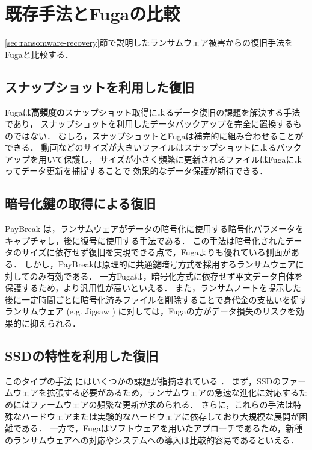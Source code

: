 \section{既存手法とFugaの比較}
\ref{sec:ransomware-recovery}節で説明したランサムウェア被害からの復旧手法をFugaと比較する．
\subsection{スナップショットを利用した復旧}
Fugaは\textbf{高頻度の}スナップショット取得によるデータ復旧の課題を解決する手法であり，
スナップショットを利用したデータバックアップを完全に置換するものではない．
むしろ，スナップショットとFugaは補完的に組み合わせることができる．
動画などのサイズが大きいファイルはスナップショットによるバックアップを用いて保護し，
サイズが小さく頻繁に更新されるファイルはFugaによってデータ更新を捕捉することで
効果的なデータ保護が期待できる．

\subsection{暗号化鍵の取得による復旧}
PayBreak \cite{kolodenker2017paybreak}は，ランサムウェアがデータの暗号化に使用する暗号化パラメータをキャプチャし，後に復号に使用する手法である．
この手法は暗号化されたデータのサイズに依存せず復旧を実現できる点で，Fugaよりも優れている側面がある．
しかし，PayBreakは原理的に共通鍵暗号方式を採用するランサムウェアに対してのみ有効である．
一方Fugaは，暗号化方式に依存せず平文データ自体を保護するため，より汎用性が高いといえる．
また，ランサムノートを提示した後に一定時間ごとに暗号化済みファイルを削除することで身代金の支払いを促すランサムウェア (e.g. Jigsaw \cite{byrne2017jigsaw})
に対しては，Fugaの方がデータ損失のリスクを効果的に抑えられる．

\subsection{SSDの特性を利用した復旧}
このタイプの手法 \cite{huang2017flashguard,baek2018ssd} にはいくつかの課題が指摘されている \cite{wang2024ransom}．
まず，SSDのファームウェアを拡張する必要があるため，ランサムウェアの急速な進化に対応するためにはファームウェアの頻繁な更新が求められる．
さらに，これらの手法は特殊なハードウェアまたは実験的なハードウェアに依存しており大規模な展開が困難である．
一方で，Fugaはソフトウェアを用いたアプローチであるため，新種のランサムウェアへの対応やシステムへの導入は比較的容易であるといえる．

